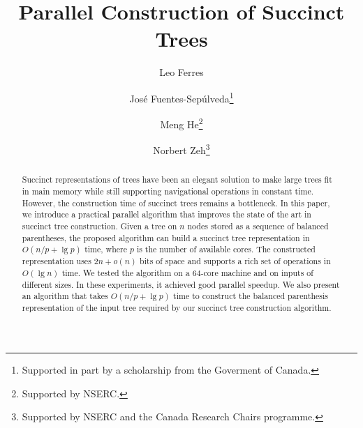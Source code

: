 \documentclass[runningheads]{llncs}
\begin{document}
\title{Parallel Construction of Succinct Trees}

\author{Leo Ferres
  \and
  Jos\'e Fuentes-Sep\'ulveda\fnmsep\thanks{Supported
    in part by a scholarship from the Goverment of Canada.}
  \and
  Meng He\fnmsep\thanks{Supported by NSERC.}
  \and
  Norbert Zeh\fnmsep\thanks{Supported by NSERC and the Canada Research
    Chairs programme.}}




\maketitle

\begin{abstract}
  Succinct representations of trees have been an elegant solution to
  make large trees fit in main memory while still supporting
  navigational operations in constant time.  However, the construction
  time of succinct trees remains a bottleneck.  In this paper, we
  introduce a practical parallel algorithm that improves the state of
  the art in succinct tree construction.  Given a tree on $n$ nodes
  stored as a sequence of balanced parentheses, the proposed algorithm
  can build a succinct tree representation in $O(n/p+\lg p)$ time,
  where $p$ is the number of available cores.  The constructed
  representation uses $2n + o(n)$ bits of space and supports a rich
  set of operations in $O(\lg n)$ time.  We tested the algorithm on a
  $64$-core machine and on inputs of different sizes.  In these
  experiments, it achieved good parallel speedup.  We also present an
  algorithm that takes $O(n/p + \lg p)$ time to construct the
  balanced parenthesis representation of the input tree required by
  our succinct tree construction algorithm.
\end{abstract}
%

\end{document}
